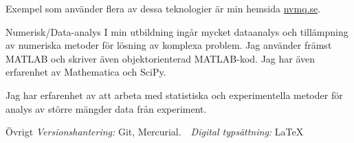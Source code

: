 \begin{myitemize}
    Exempel som använder flera av dessa teknologier är min
    hemsida \url{nvmq.se}.

  \item[Numerisk/Data-analys] I min utbildning ingår mycket dataanalys och
    tillämpning av numeriska metoder för lösning av komplexa problem.  Jag
    använder främst MATLAB och skriver även objektorienterad
    MATLAB-kod. Jag har även erfarenhet av Mathematica och SciPy.

    Jag har erfarenhet av att arbeta med statistiska och experimentella metoder för
    analys av större mängder data från experiment.
  \item[Övrigt] \emph{Versionshantering:} Git,
    Mercurial. \,\, \emph{Digital typsättning:} \LaTeX
\end{myitemize}


